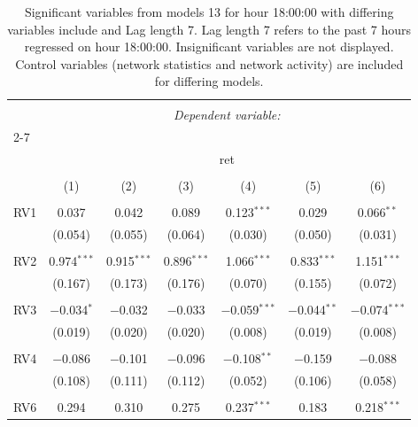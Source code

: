 
\begin{table}[!htbp] \centering 
  \caption{Significant variables from models 13 for hour 18:00:00 with differing variables include 
                               and Lag length 7. Lag length 7 refers to the past 7 hours regressed on hour 18:00:00. 
                               Insignificant variables are not displayed. 
                               Control variables (network statistics and network activity) are 
                               included for differing models.} 
  \label{RVmodels1_t_hourlagged5} 
\scriptsize 
\begin{tabular}{@{\extracolsep{5pt}}lcccccc} 
\\[-1.8ex]\hline 
\hline \\[-1.8ex] 
 & \multicolumn{6}{c}{\textit{Dependent variable:}} \\ 
\cline{2-7} 
\\[-1.8ex] & \multicolumn{6}{c}{ret} \\ 
\\[-1.8ex] & (1) & (2) & (3) & (4) & (5) & (6)\\ 
\hline \\[-1.8ex] 
 RV1 & 0.037 & 0.042 & 0.089 & 0.123$^{***}$ & 0.029 & 0.066$^{**}$ \\ 
  & (0.054) & (0.055) & (0.064) & (0.030) & (0.050) & (0.031) \\ 
  & & & & & & \\ 
 RV2 & 0.974$^{***}$ & 0.915$^{***}$ & 0.896$^{***}$ & 1.066$^{***}$ & 0.833$^{***}$ & 1.151$^{***}$ \\ 
  & (0.167) & (0.173) & (0.176) & (0.070) & (0.155) & (0.072) \\ 
  & & & & & & \\ 
 RV3 & $-$0.034$^{*}$ & $-$0.032 & $-$0.033 & $-$0.059$^{***}$ & $-$0.044$^{**}$ & $-$0.074$^{***}$ \\ 
  & (0.019) & (0.020) & (0.020) & (0.008) & (0.019) & (0.008) \\ 
  & & & & & & \\ 
 RV4 & $-$0.086 & $-$0.101 & $-$0.096 & $-$0.108$^{**}$ & $-$0.159 & $-$0.088 \\ 
  & (0.108) & (0.111) & (0.112) & (0.052) & (0.106) & (0.058) \\ 
  & & & & & & \\ 
 RV6 & 0.294 & 0.310 & 0.275 & 0.237$^{***}$ & 0.183 & 0.218$^{***}$ \\ 

\end{tabular}
\end{table}
